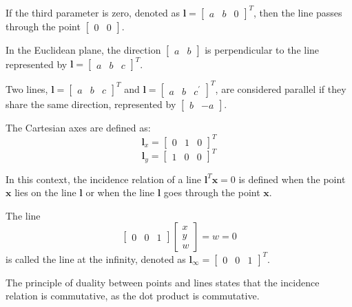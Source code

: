 \begin{property}
    If the third parameter is zero, denoted as $\mathbf{l}=\begin{bmatrix} a & b & 0 \end{bmatrix}^T$, then the line passes through the point $\begin{bmatrix} 0 & 0 \end{bmatrix}$. 
\end{property}
\begin{property}
    In the Euclidean plane, the direction $\begin{bmatrix} a & b \end{bmatrix}$ is perpendicular to the line represented by $\mathbf{l}=\begin{bmatrix} a & b & c \end{bmatrix}^T$.
\end{property}
\begin{property}
    Two lines, $\mathbf{l}=\begin{bmatrix} a & b & c \end{bmatrix}^T$ and $\mathbf{l}=\begin{bmatrix} a & b & c^\prime \end{bmatrix}^T$, are considered parallel if they share the same direction, represented by $\begin{bmatrix} b & -a \end{bmatrix}$.
\end{property}
\begin{example}
    The Cartesian axes are defined as: 
    \[\mathbf{l}_x={\begin{bmatrix} 0 & 1 & 0 \end{bmatrix}}^T\]
    \[\mathbf{l}_y={\begin{bmatrix} 1 & 0 & 0 \end{bmatrix}}^T\]
\end{example}
In this context, the incidence relation of a line $\mathbf{l}^T\mathbf{x}=0$ is defined when the point $\mathbf{x}$ lies on the line $\mathbf{l}$ or when the line $\mathbf{l}$ goes through the point $\mathbf{x}$. 
\begin{definition}
    The line 
    \[\begin{bmatrix} 0 & 0 & 1 \end{bmatrix} \begin{bmatrix} x \\ y \\ w \end{bmatrix}=w=0\] 
    is called the line at the infinity, denoted as $\mathbf{l}_{\infty}={\begin{bmatrix} 0 & 0 & 1 \end{bmatrix}}^T$. 
\end{definition}
The principle of duality between points and lines states that the incidence relation is commutative, as the dot product is commutative.

